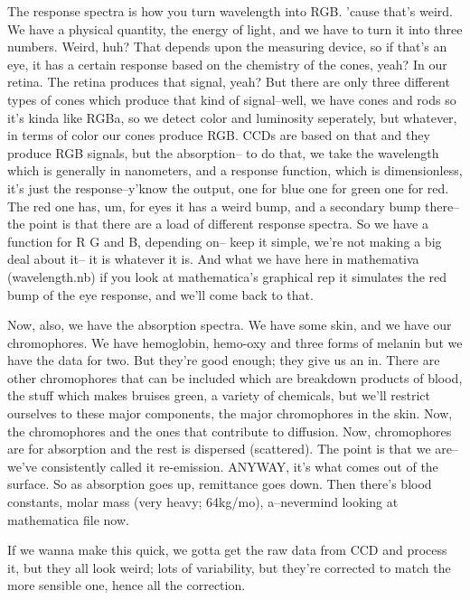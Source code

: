 The response spectra is how you turn wavelength into RGB. 'cause that's weird. We have a physical quantity, the energy of light, and we have to turn it into three numbers. Weird, huh? That depends upon the measuring device, so if that's an eye, it has a certain response based on the chemistry of the cones, yeah? In our retina. The retina produces that signal, yeah? But there are only three different types of cones which produce that kind of signal--well, we have cones and rods so it's kinda like RGBa, so we detect color and luminosity seperately, but whatever, in terms of color our cones produce RGB. CCDs are based on that and they produce RGB signals, but the absorption-- to do that, we take the wavelength which is generally in nanometers, and a response function, which is dimensionless, it's just the response--y'know the output, one for blue one for green one for red. The red one has, um, for eyes it has a weird bump, and a secondary bump there--the point is that there are a load of different response spectra. So we have a function for R G and B, depending on-- keep it simple, we're not making a big deal about it-- it is whatever it is. And what we have here in mathemativa (wavelength.nb) if you look at mathematica's graphical rep it simulates the red bump of the eye response, and we'll come back to that.

Now, also, we have the absorption spectra. We have some skin, and we have our chromophores. We have hemoglobin, hemo-oxy and three forms of melanin but we have the data for two. But they're good enough; they give us an in. There are other chromophores that can be included which are breakdown products of blood, the stuff which makes bruises green, a variety of chemicals, but we'll restrict ourselves to these major components, the major chromophores in the skin. Now, the chromophores and the ones that contribute to diffusion. Now, chromophores are for absorption and the rest is dispersed (scattered). The point is that we are--we've consistently called it re-emission. ANYWAY, it's what comes out of the surface. So as absorption goes up, remittance goes down. Then there's blood constants, molar mass (very heavy; 64kg/mo), a--nevermind looking at mathematica file now.

If we wanna make this quick, we gotta get the raw data from CCD and process it, but they all look weird; lots of variability, but they're corrected to match the more sensible one, hence all the correction.








